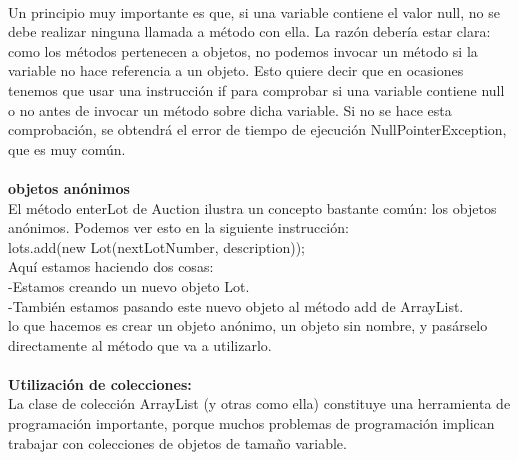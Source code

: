 \documentclass[11pt,a4paper]{article}
\begin{document}
	\\
	Un principio muy importante es que, si una variable contiene el valor null, no se debe realizar
	ninguna llamada a método con ella. La razón debería estar clara: como los métodos pertenecen a
	objetos, no podemos invocar un método si la variable no hace referencia a un objeto. Esto quiere
	decir que en ocasiones tenemos que usar una instrucción if para comprobar si una variable contiene
	null o no antes de invocar un método sobre dicha variable. Si no se hace esta comprobación,
	se obtendrá el error de tiempo de ejecución NullPointerException, que es muy común.\\
	\\
	\textbf{objetos anónimos}\\
	El método enterLot de Auction ilustra un concepto bastante común: los objetos anónimos.
	Podemos ver esto en la siguiente instrucción:\\
	lots.add(new Lot(nextLotNumber, description));\\
	Aquí estamos haciendo dos cosas:\\
	-Estamos creando un nuevo objeto Lot.\\
	-También estamos pasando este nuevo objeto al método add de ArrayList.\\
	lo que hacemos es crear un objeto anónimo, un objeto sin nombre, y pasárselo directamente
	al método que va a utilizarlo.
	\\
	\\
	\textbf{Utilización de colecciones:}\\
	La clase de colección ArrayList (y otras como ella) constituye una herramienta de programación
	importante, porque muchos problemas de programación implican trabajar con colecciones
	de objetos de tamaño variable.
\end{document}

